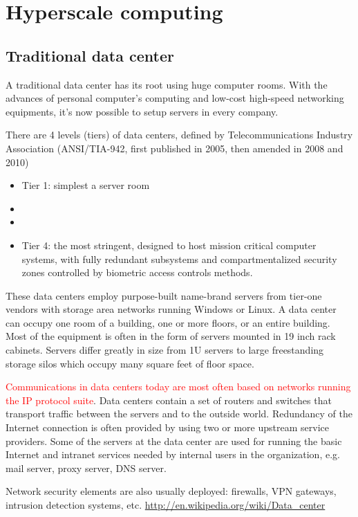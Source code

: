 \chapter{Hyperscale computing}

\section{Traditional data center}
\label{sec:traditional-datacenter}

A traditional data center has its root using huge computer rooms. With the
advances of personal computer's computing and low-cost high-speed networking
equipments, it's now possible to setup servers in every company. 

There are 4 levels (tiers) of data centers, defined by  Telecommunications
Industry Association (ANSI/TIA-942, first published in 2005, then amended in
2008 and 2010)
\begin{itemize}
  \item Tier 1: simplest a server room
  \item 
  \item 
  \item Tier 4: the most stringent, designed to host mission critical computer
  systems, with fully redundant subsystems and compartmentalized security zones
  controlled by biometric access controls methods.
\end{itemize}

These data centers employ purpose-built name-brand servers from tier-one vendors
with storage area networks  running Windows or Linux. A data center can occupy
one room of a building, one or more floors, or an entire building. Most of the
equipment is often in the form of servers mounted in 19 inch rack cabinets. 
Servers differ greatly in size from 1U servers to large freestanding storage
silos which occupy many square feet of floor space. 

\textcolor{red}{Communications in data centers today are most often based on
networks running the IP protocol suite}. Data centers contain a set of routers
and switches that transport traffic between the servers and to the outside
world. Redundancy of the Internet connection is often provided by using two or
more upstream service providers. Some of the servers at the data center are used
for running the basic Internet and intranet services needed by internal users in
the organization, e.g. mail server, proxy server, DNS server.

Network security elements are also usually deployed: firewalls, VPN gateways,
intrusion detection systems, etc. \url{http://en.wikipedia.org/wiki/Data_center}

